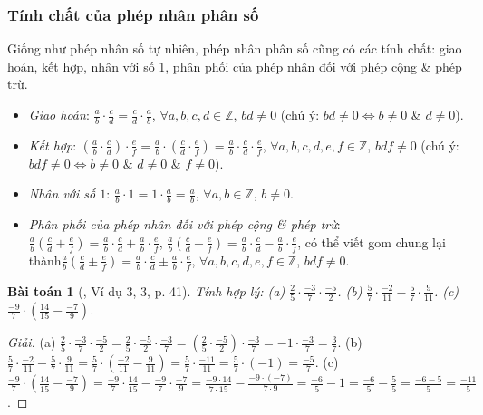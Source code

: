 \documentclass{article}
\newtheorem{baitoan}{Bài toán}
\begin{document}
\subsubsection{Tính chất của phép nhân phân số}
Giống như phép nhân số tự nhiên, phép nhân phân số cũng có các tính chất: giao hoán, kết hợp, nhân với số 1, phân phối của phép nhân đối với phép cộng \& phép trừ.
\begin{itemize}
	\item \textit{Giao hoán}: $\frac{a}{b}\cdot\frac{c}{d} =  \frac{c}{d}\cdot\frac{a}{b}$, $\forall a,b,c,d\in\mathbb{Z}$, $bd\ne0$ (chú ý: $bd\ne0\Leftrightarrow b\ne0$ \& $d\ne0$).
	\item \textit{Kết hợp}: $\left(\frac{a}{b}\cdot\frac{c}{d}\right)\cdot\frac{e}{f} = \frac{a}{b}\cdot\left(\frac{c}{d}\cdot\frac{e}{f}\right) = \frac{a}{b}\cdot\frac{c}{d}\cdot\frac{e}{f}$, $\forall a,b,c,d,e,f\in\mathbb{Z}$, $bdf\ne0$ (chú ý: $bdf\ne0\Leftrightarrow b\ne0$ \& $d\ne0$ \& $f\ne0$).
	\item \textit{Nhân với số $1$}: $\frac{a}{b}\cdot1 = 1\cdot\frac{a}{b} = \frac{a}{b}$, $\forall a,b\in\mathbb{Z}$, $b\ne0$.
	\item \textit{Phân phối của phép nhân đối với phép cộng \& phép trừ}: $\frac{a}{b}\left(\frac{c}{d} + \frac{e}{f}\right) = \frac{a}{b}\cdot\frac{c}{d} + \frac{a}{b}\cdot\frac{e}{f}$, $\frac{a}{b}\left(\frac{c}{d} - \frac{e}{f}\right) = \frac{a}{b}\cdot\frac{c}{d} - \frac{a}{b}\cdot\frac{e}{f}$, có thể viết gom chung lại thành$\frac{a}{b}\left(\frac{c}{d}\pm\frac{e}{f}\right) = \frac{a}{b}\cdot\frac{c}{d}\pm\frac{a}{b}\cdot\frac{e}{f}$, $\forall a,b,c,d,e,f\in\mathbb{Z}$, $bdf\ne0$.
\end{itemize}

\begin{baitoan}[\cite{SGK_Toan_6_Canh_Dieu_tap_2}, Ví dụ 3, 3, p. 41]
	Tính hợp lý: (a) $\frac{2}{5}\cdot\frac{-3}{7}\cdot\frac{-5}{2}$. (b) $\frac{5}{7}\cdot\frac{-2}{11} - \frac{5}{7}\cdot\frac{9}{11}$. (c) $\frac{-9}{7}\cdot\left(\frac{14}{15} - \frac{-7}{9}\right)$.
\end{baitoan}

\begin{proof}[Giải]
	(a) $\frac{2}{5}\cdot\frac{-3}{7}\cdot\frac{-5}{2} = \frac{2}{5}\cdot\frac{-5}{2}\cdot\frac{-3}{7} = \left(\frac{2}{5}\cdot\frac{-5}{2}\right)\cdot\frac{-3}{7} = -1\cdot\frac{-3}{7} = \frac{3}{7}$. (b) $\frac{5}{7}\cdot\frac{-2}{11} - \frac{5}{7}\cdot\frac{9}{11} = \frac{5}{7}\cdot\left(\frac{-2}{11} - \frac{9}{11}\right) = \frac{5}{7}\cdot\frac{-11}{11} = \frac{5}{7}\cdot(-1) = \frac{-5}{7}$. (c) $\frac{-9}{7}\cdot\left(\frac{14}{15} - \frac{-7}{9}\right) = \frac{-9}{7}\cdot\frac{14}{15} - \frac{-9}{7}\cdot\frac{-7}{9} = \frac{-9\cdot14}{7\cdot15} - \frac{-9\cdot(-7)}{7\cdot9} = \frac{-6}{5} - 1 = \frac{-6}{5} - \frac{5}{5} = \frac{-6 - 5}{5} = \frac{-11}{5}$.
\end{proof}
\end{document}
